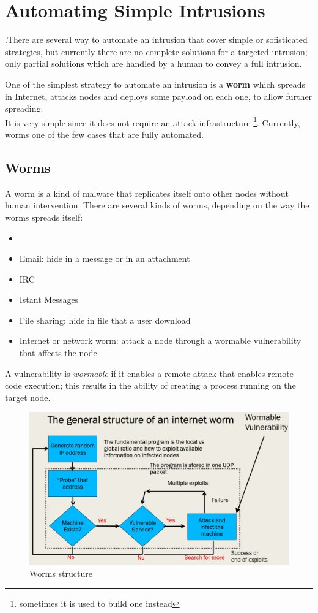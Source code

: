 \chapter{Automating Simple Intrusions}

.There are several way to automate an intrusion that cover
simple or sofisticated strategies,
but currently there are no complete solutions for a targeted intrusion; only
partial solutions which are handled by a human to convey a full intrusion.\nl

One of the simplest strategy to automate an intrusion is a \textbf{worm} which spreads in Internet, attacks nodes
and deploys some payload on each one,
to allow further spreading.\\
It is very simple since it does not require an attack infrastructure
\footnote{sometimes it is used to build one instead}.
Currently, worms one of the few cases that are fully automated.

\section{Worms}
A worm is a kind of malware that replicates itself onto other nodes
without human intervention.
There are several kinds of worms, depending on the way the worms spreads itself:
\begin{itemize}
   \item 
   \item Email: hide in a message or in an attachment
   \item IRC
   \item Istant Messages
   \item File sharing: hide in file that a user download
   \item Internet or network worm: attack a node through a wormable   vulnerability that affects the node
\end{itemize}
A vulnerability is \textit{wormable} if it enables a remote attack that enables remote code execution;
this results in the ability of creating a
process running on the target node.

\begin{figure}[htbp]
   \centering
   \includegraphics{images/worms_structure.png}
   \caption{Worms structure}
   \label{fig:worms_structure}
\end{figure}

